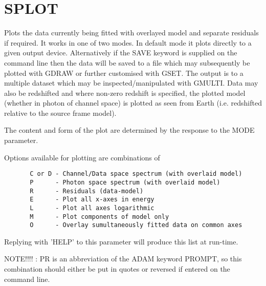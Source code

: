 \documentclass{book}
\renewcommand{\_}{{\tt\char'137}}     %
\begin{document}
\section{SPLOT}
Plots the data currently being fitted with overlayed model and
separate residuals if required. It works in one of two modes.
In default mode it plots directly to a given output device.
Alternatively if the SAVE keyword is supplied on the command line
then the data will be saved to a file which may subsequently be
plotted with GDRAW or further customised with GSET. The output
is to a multiple dataset which may be inspected/manipulated with
GMULTI. Data may also be redshifted and where non-zero redshift
is specified, the plotted model (whether in photon of channel
space) is plotted as seen from Earth (i.e. redshifted relative to
the source frame model).

The content and form of the plot are determined by the response
to the MODE parameter.

Options available for plotting are combinations of

\begin{verbatim}
       C or D - Channel/Data space spectrum (with overlaid model)
       P      - Photon space spectrum (with overlaid model)
       R      - Residuals (data-model)
       E      - Plot all x-axes in energy
       L      - Plot all axes logarithmic
       M      - Plot components of model only
       O      - Overlay sumultaneously fitted data on common axes
\end{verbatim}
Replying with 'HELP' to this parameter will produce this list at
run-time.

NOTE!!!! : PR is an abbreviation of the ADAM keyword PROMPT, so this
combination should either be put in quotes or reversed if
entered on the command line.
\end{document}
